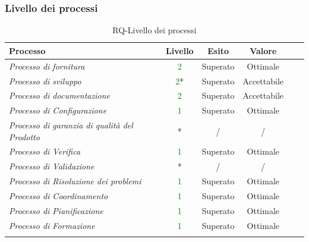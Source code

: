 \subsubsection{Livello dei processi}
\begin{longtable}{|>{\centering}m{6cm}|c|c|c|c|c|}
\hline
\textbf{Processo} & \textbf{Livello} & \textbf{Esito} & \textbf{Valore}\\
\hline
\endhead
\emph{Processo di fornitura} & \textcolor{Green}{2} & Superato & Ottimale\\ \hline
\emph{Processo di sviluppo} & \textcolor{Green}{2}* & Superato & Accettabile\\ \hline
\emph{Processo di documentazione} & \textcolor{Green}{2} & Superato & Accettabile\\ 
\hline
\emph{Processo di Configurazione} & \textcolor{Green}{1} & Superato & Ottimale\\ 
\hline
\emph{Processo di garanzia di qualità del Prodotto} & * & / & /\\ 
\hline
\emph{Processo di Verifica} & \textcolor{Green}{1} & Superato & Ottimale\\ 
\hline
\emph{Processo di Validazione} & * & / & /\\ 
\hline
\emph{Processo di Risoluzione dei problemi} & \textcolor{Green}{1} & Superato & Ottimale\\ 
\hline
\emph{Processo di Coordinamento} & \textcolor{Green}{1} & Superato & Ottimale\\ 
\hline
\emph{Processo di Pianificazione} & \textcolor{Green}{1} & Superato & Ottimale\\ 
\hline
\emph{Processo di Formazione} & \textcolor{Green}{1} & Superato & Ottimale\\ 
\hline
\caption{RQ-Livello dei processi}
\end{longtable}
